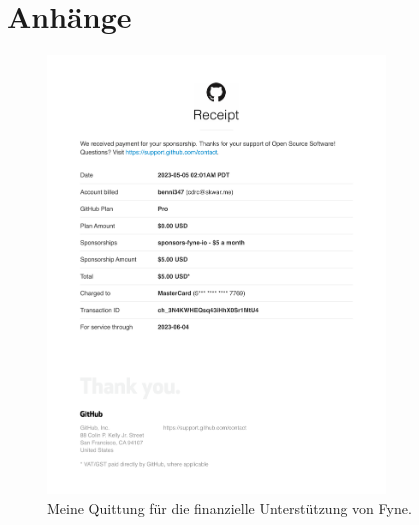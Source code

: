 \section{Anhänge}
\begin{figure}[htbp]
  \centering
  \includegraphics[width=0.8\textwidth]{rechnungen/github-benni347-receipt-2023-05-05.pdf}
  \caption{Meine Quittung für die finanzielle Unterstützung von Fyne.}
  \label{fig:fyneio-rechnung}
\end{figure}